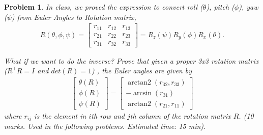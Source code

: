 \documentclass{article}
\newtheorem{prob}{Problem}
\newif\ifsol
\DeclareMathOperator{\atantwo}{arctan2}
\begin{document}
\begin{prob}
  In class, we proved the expression to convert roll ($\theta$), pitch
  ($\phi$), yaw ($\psi$) from Euler Angles to Rotation matrix,
  \begin{align}
    R(\theta, \phi, \psi) =
    \begin{bmatrix}
      r_{11}& r_{12} & r_{13} \\
      r_{21}& r_{22} & r_{23} \\
      r_{31}& r_{32} & r_{33}
    \end{bmatrix} 
                       = R_z(\psi) R_y(\phi) R_x(\theta).
  \end{align}
  
  What if we want to do the inverse? Prove that given a proper 3x3 rotation
  matrix  ($R^\top R = I$ and $det(R) = 1$) , the Euler angles are given by
  \begin{align}
    \begin{bmatrix}
    \theta(R) \\
    \phi(R) \\
    \psi(R)
    \end{bmatrix}
    = \begin{bmatrix}
      \atantwo(r_{32}, r_{33}) \\
      -\arcsin(r_{31}) \\
      \atantwo(r_{21}, r_{11})
      \end{bmatrix}
  \end{align}
  where $r_{ij}$ is the element in $i$th row and $j$th column of the rotation
  matrix $R$. (10 marks. Used in the
  following problems. Estimated time: 15 min).
\end{prob}

\ifsol
\end{document}
